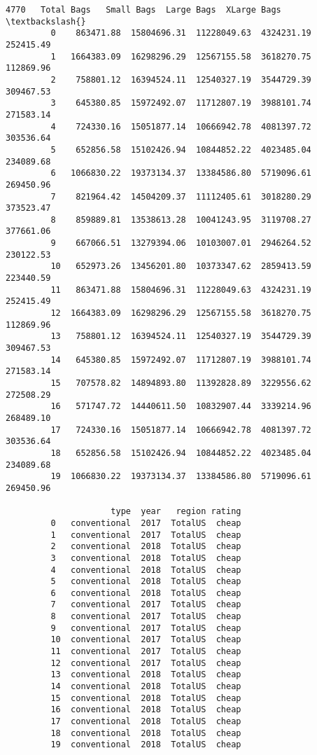 \documentclass[11pt]{article}
\begin{document}
\begin{Verbatim}[commandchars=\\\{\}]
                   4770   Total Bags   Small Bags  Large Bags  XLarge Bags  \textbackslash{}
         0    863471.88  15804696.31  11228049.63  4324231.19    252415.49   
         1   1664383.09  16298296.29  12567155.58  3618270.75    112869.96   
         2    758801.12  16394524.11  12540327.19  3544729.39    309467.53   
         3    645380.85  15972492.07  11712807.19  3988101.74    271583.14   
         4    724330.16  15051877.14  10666942.78  4081397.72    303536.64   
         5    652856.58  15102426.94  10844852.22  4023485.04    234089.68   
         6   1066830.22  19373134.37  13384586.80  5719096.61    269450.96   
         7    821964.42  14504209.37  11112405.61  3018280.29    373523.47   
         8    859889.81  13538613.28  10041243.95  3119708.27    377661.06   
         9    667066.51  13279394.06  10103007.01  2946264.52    230122.53   
         10   652973.26  13456201.80  10373347.62  2859413.59    223440.59   
         11   863471.88  15804696.31  11228049.63  4324231.19    252415.49   
         12  1664383.09  16298296.29  12567155.58  3618270.75    112869.96   
         13   758801.12  16394524.11  12540327.19  3544729.39    309467.53   
         14   645380.85  15972492.07  11712807.19  3988101.74    271583.14   
         15   707578.82  14894893.80  11392828.89  3229556.62    272508.29   
         16   571747.72  14440611.50  10832907.44  3339214.96    268489.10   
         17   724330.16  15051877.14  10666942.78  4081397.72    303536.64   
         18   652856.58  15102426.94  10844852.22  4023485.04    234089.68   
         19  1066830.22  19373134.37  13384586.80  5719096.61    269450.96   
         
                     type  year   region rating  
         0   conventional  2017  TotalUS  cheap  
         1   conventional  2017  TotalUS  cheap  
         2   conventional  2018  TotalUS  cheap  
         3   conventional  2018  TotalUS  cheap  
         4   conventional  2018  TotalUS  cheap  
         5   conventional  2018  TotalUS  cheap  
         6   conventional  2018  TotalUS  cheap  
         7   conventional  2017  TotalUS  cheap  
         8   conventional  2017  TotalUS  cheap  
         9   conventional  2017  TotalUS  cheap  
         10  conventional  2017  TotalUS  cheap  
         11  conventional  2017  TotalUS  cheap  
         12  conventional  2017  TotalUS  cheap  
         13  conventional  2018  TotalUS  cheap  
         14  conventional  2018  TotalUS  cheap  
         15  conventional  2018  TotalUS  cheap  
         16  conventional  2018  TotalUS  cheap  
         17  conventional  2018  TotalUS  cheap  
         18  conventional  2018  TotalUS  cheap  
         19  conventional  2018  TotalUS  cheap  
\end{Verbatim}
            
\end{document}
